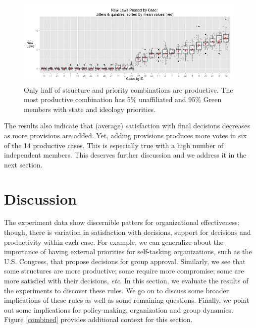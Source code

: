 \documentclass[pdftex,12pt]{llncs}
\begin{document}
\begin{figure}[hb]
\centering
\includegraphics[width=4.9in]{laws_byJob_jitterQuints.png}
\caption[ ]{Only half of structure and priority combinations are productive. The most productive combination has 5\% unaffiliated and 95\% Green members with state and ideology priorities.} 
\label{lawspassed}
\end{figure}
 
  
The results also indicate that (average) satisfaction with final decisions decreases as more provisions are added.
Yet, adding provisions produces more votes in six of the 14 productive cases. 
This is especially true with a high number of independent members.  
This deserves further discussion and we address it in the next section.


\section{Discussion}
%
The experiment data show discernible patters for organizational effectiveness; though, there is variation in satisfaction with decisions, support for decisions and productivity within each case.
For example, we can generalize about the importance of having external priorities for self-tasking organizations, such as the U.S. Congress, that propose decisions for group approval. 
Similarly, we see that some structures are more productive; some require more compromise; some are more satisfied with their decisions, \textit{etc}. 
In this section, we evaluate the results of the experiments to discover these rules. 
We go on to discuss some broader implications of these rules as well as some remaining questions.
Finally, we point out some implications for policy-making, organization and group dynamics. 
Figure \ref{combined} provides additional context for this section.
\end{document}

